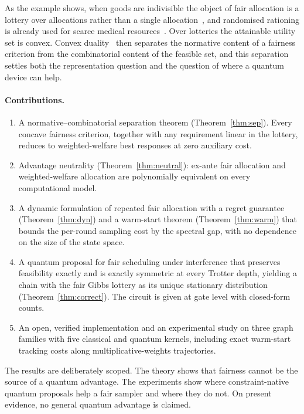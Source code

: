 \documentclass[11pt,a4paper]{article}
\begin{document}
As the example shows, when goods are indivisible the object of fair allocation is a lottery over
allocations rather than a single allocation~\cite{diamond1967cardinal,aziz2024best,harsanyi1955cardinal}, and randomised
rationing is already used for scarce medical resources~\cite{white2022multicenter,pathak2024fair}.
Over lotteries the attainable utility set is convex. Convex duality~\cite{rockafellar1970convex}
then separates the normative content of a fairness criterion from the combinatorial content of the
feasible set, and this separation settles both the representation question and the question of
where a quantum device can help.

\paragraph{Contributions.}
\begin{enumerate}[leftmargin=*]
\item A normative--combinatorial separation theorem (Theorem~\ref{thm:sep}). Every concave fairness
criterion, together with any requirement linear in the lottery, reduces to weighted-welfare best
responses at zero auxiliary cost.
\item Advantage neutrality (Theorem~\ref{thm:neutral}): ex-ante fair allocation and weighted-welfare
allocation are polynomially equivalent on every computational model.
\item A dynamic formulation of repeated fair allocation with a regret guarantee
(Theorem~\ref{thm:dyn}) and a warm-start theorem (Theorem~\ref{thm:warm}) that bounds the per-round
sampling cost by the spectral gap, with no dependence on the size of the state space.
\item A quantum proposal for fair scheduling under interference that preserves feasibility exactly
and is exactly symmetric at every Trotter depth, yielding a chain with the fair Gibbs lottery as its unique stationary
distribution (Theorem~\ref{thm:correct}). The circuit is given at gate level with closed-form
counts.
\item An open, verified implementation and an experimental study on three graph families with five
classical and quantum kernels, including exact warm-start tracking costs along
multiplicative-weights trajectories.
\end{enumerate}

The results are deliberately scoped. The theory shows that fairness cannot be the source of a
quantum advantage. The experiments show where constraint-native quantum proposals help a fair
sampler and where they do not. On present evidence, no general quantum advantage is claimed.
\end{document}
